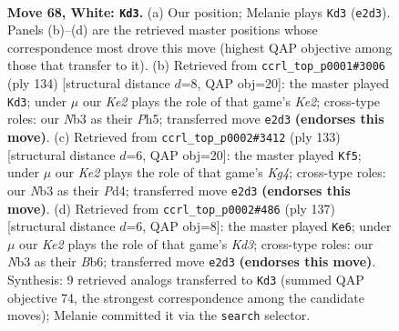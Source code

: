 \documentclass[11pt]{article}
\begin{document}
\clearpage

\begin{figure}[p]\centering
\begin{subfigure}{0.46\textwidth}\centering
\resizebox{\linewidth}{!}{%
\newchessgame
\chessboard[
  setfen={7k/2P5/2r5/8/8/1N4B1/4K3/8 w - - 49 68},
  showmover=false,
  pgfstyle=straightmove, color=movearrow, markmove={e2-d3}
]}
\caption{}
\end{subfigure}\hfill
\begin{subfigure}{0.46\textwidth}\centering
\resizebox{\linewidth}{!}{%
\newchessgame
\chessboard[
  setfen={8/1B6/2P5/2r4P/8/6k1/4K3/8 w - - 3 68},
  showmover=false,
  pgfstyle=straightmove, color=movearrow, markmove={e2-d3}
]}
\caption{}
\end{subfigure}
\\[4pt]
\begin{subfigure}{0.46\textwidth}\centering
\resizebox{\linewidth}{!}{%
\newchessgame
\chessboard[
  setfen={1b6/8/8/6k1/3p4/5K2/7p/7R b - - 7 67},
  showmover=false,
  pgfstyle=straightmove, color=movearrow, markmove={g5-f5}
]}
\caption{}
\end{subfigure}\hfill
\begin{subfigure}{0.46\textwidth}\centering
\resizebox{\linewidth}{!}{%
\newchessgame
\chessboard[
  setfen={b7/5R2/1b1k4/8/6K1/5p2/8/8 b - - 3 69},
  showmover=false,
  pgfstyle=straightmove, color=movearrow, markmove={d6-e6}
]}
\caption{}
\end{subfigure}
\caption{\textbf{Move 68, White: \texttt{Kd3}.} (a) Our position; Melanie plays \texttt{Kd3} (\texttt{e2d3}). Panels (b)--(d) are the retrieved master positions whose correspondence most drove this move (highest QAP objective among those that transfer to it). (b) Retrieved from \texttt{ccrl\_top\_p0001\#3006} (ply 134) [structural distance $d$=8, QAP obj=20]: the master played \texttt{Kd3}; under $\mu$ our \emph{Ke2} plays the role of that game's \emph{Ke2}; cross-type roles: our \emph{N}b3 as their \emph{P}h5; transferred move \texttt{e2d3} \textbf{(endorses this move)}. (c) Retrieved from \texttt{ccrl\_top\_p0002\#3412} (ply 133) [structural distance $d$=6, QAP obj=20]: the master played \texttt{Kf5}; under $\mu$ our \emph{Ke2} plays the role of that game's \emph{Kg4}; cross-type roles: our \emph{N}b3 as their \emph{P}d4; transferred move \texttt{e2d3} \textbf{(endorses this move)}. (d) Retrieved from \texttt{ccrl\_top\_p0002\#486} (ply 137) [structural distance $d$=6, QAP obj=8]: the master played \texttt{Ke6}; under $\mu$ our \emph{Ke2} plays the role of that game's \emph{Kd3}; cross-type roles: our \emph{N}b3 as their \emph{B}b6; transferred move \texttt{e2d3} \textbf{(endorses this move)}. Synthesis: 9 retrieved analogs transferred to \texttt{Kd3} (summed QAP objective 74, the strongest correspondence among the candidate moves); Melanie committed it via the \texttt{search} selector.}
\label{fig:thought-m134}
\end{figure}
\end{document}
